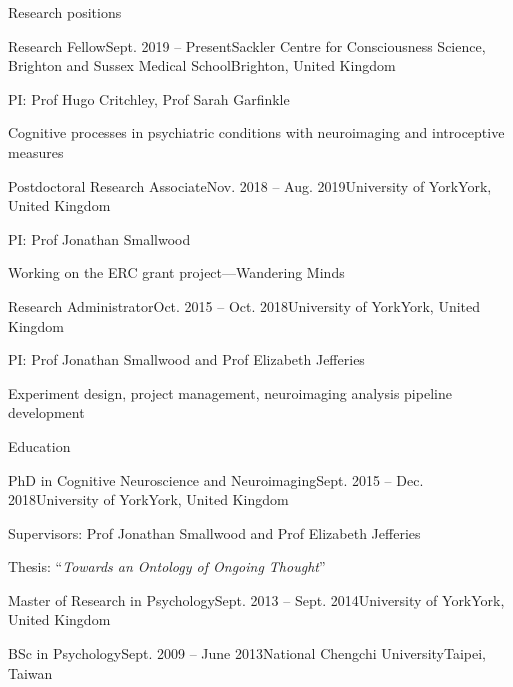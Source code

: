 \documentclass{resume} %
\begin{document}

\begin{rSection}{Research positions}

\begin{rSubsection}{Research Fellow}{Sept. 2019 -- Present}{Sackler Centre for Consciousness Science, Brighton and Sussex Medical School}{Brighton, United Kingdom}
\item PI: Prof Hugo Critchley, Prof Sarah Garfinkle
\item Cognitive processes in psychiatric conditions with neuroimaging and introceptive measures
\end{rSubsection}

\begin{rSubsection}{Postdoctoral Research Associate}{Nov. 2018 -- Aug. 2019}{University of York}{York, United Kingdom}
\item PI: Prof Jonathan Smallwood
\item Working on the ERC grant project---Wandering Minds
\end{rSubsection}

\begin{rSubsection}{Research Administrator}{Oct. 2015 -- Oct. 2018}{University of York}{York, United Kingdom}
  \item PI: Prof Jonathan Smallwood and Prof Elizabeth Jefferies
  \item Experiment design, project management, neuroimaging analysis pipeline development
\end{rSubsection}

\end{rSection}


\begin{rSection}{Education}

\begin{rSubsection}{PhD in Cognitive Neuroscience and Neuroimaging}{Sept. 2015 -- Dec. 2018}{University of York}{York, United Kingdom}
  \item Supervisors: Prof Jonathan Smallwood and Prof Elizabeth Jefferies
  \item Thesis: ``\textit{Towards an Ontology of Ongoing Thought}''
\end{rSubsection}

\begin{EDUrSubsection}{Master of Research in Psychology}{Sept. 2013 -- Sept. 2014}{University of York}{York, United Kingdom}
\end{EDUrSubsection}

\begin{EDUrSubsection}{BSc in Psychology}{Sept. 2009 -- June 2013}{National Chengchi University}{Taipei, Taiwan}
\end{EDUrSubsection}

\end{rSection}
\end{document}
